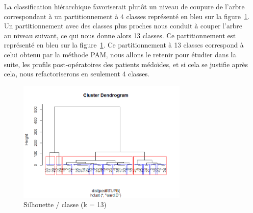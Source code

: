 La classification hiérarchique favoriserait plutôt un niveau de coupure de l'arbre correspondant à un partitionnement à 4 classes représenté en bleu sur la figure~\ref{fig-rtupb-post-cah}.
Un partitionnement avec des classes plus proches nous conduit à couper l'arbre au niveau suivant, ce qui
nous donne alors 13 classes. Ce partitionnement est représenté en bleu sur la figure~\ref{fig-rtupb-post-cah}.
Ce partitionnement à 13 classes correspond à celui obtenu par la méthode PAM, nous allons le retenir pour 
étudier dans la suite, les profils post-opératoires des patients médoïdes, et si cela se justifie après cela, nous refactoriserons en seulement 4 classes.

\begin{figure}[H]
\centering
\includegraphics[width=0.75\textwidth]{../Fig/RTUPB/rtupb-cah-k13-post.png}
\caption{Silhouette / classe (k = 13)}
\label{fig-rtupb-post-cah}
\end{figure}


%
